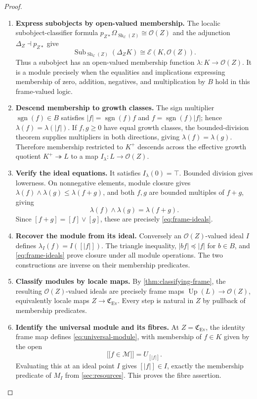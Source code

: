 \documentclass[11pt,a4paper]{article}
\numberwithin{algorithm}{section}
\numberwithin{equation}{section}
\theoremstyle{definition}
\theoremstyle{remark}
\theoremstyle{plain}
\newcommand{\E}{\mathcal E}
\newcommand{\onto}{\twoheadrightarrow}
\newcommand{\llbracket}{\mathopen{[\![}}
\newcommand{\rrbracket}{\mathclose{]\!]}}
\newcommand{\Sub}{\operatorname{Sub}}
\newcommand{\Ev}{{\operatorname{Ev}}}
\newcommand{\abs}[1]{\lvert #1\rvert}
\newcommand{\Cplx}{\mathfrak C_{\Ev}}
\newcommand{\Up}{\operatorname{Up}}
\newcommand{\Sh}{\operatorname{Sh}}
\theoremstyle{definition}
\theoremstyle{plain}
\begin{document}
\begin{proof}\leavevmode
\begin{enumerate}[leftmargin=*,align=left]
\item \textbf{Express subobjects by open-valued membership.}
The localic subobject-classifier formula
$p_{Z*}\Omega_{\Sh_{\E}(Z)}\cong\mathcal O(Z)$ and the
adjunction $\Delta_Z\dashv p_{Z*}$ give
\[
 \Sub_{\Sh_{\E}(Z)}(\Delta_ZK)
 \cong\E(K,\mathcal O(Z)).
\]
Thus a subobject has an open-valued membership function
$\lambda:K\to\mathcal O(Z)$. It is a module precisely when
the equalities and implications expressing membership of zero,
addition, negatives, and multiplication by $B$ hold in this
frame-valued logic.

\item \textbf{Descend membership to growth classes.}
The sign multiplier $\operatorname{sgn}(f)\in B$ satisfies
$\abs f=\operatorname{sgn}(f)f$ and
$f=\operatorname{sgn}(f)\abs f$; hence
$\lambda(f)=\lambda(\abs f)$. If $f,g\ge0$ have equal
growth classes, the bounded-division theorem supplies
multipliers in both directions, giving $\lambda(f)=\lambda(g)$.
Therefore membership restricted to $K^+$ descends across the effective
growth quotient $K^+\onto L$ to a map
$I_\lambda:L\to\mathcal O(Z)$.

\item \textbf{Verify the ideal equations.}
It satisfies $I_\lambda(0)=\top$. Bounded division gives
lowerness. On nonnegative elements, module closure gives
$\lambda(f)\wedge\lambda(g)\le\lambda(f+g)$,
and both $f,g$ are bounded multiples of $f+g$, giving
\[
 \lambda(f)\wedge\lambda(g)=\lambda(f+g).
\]
Since $[f+g]=[f]\vee[g]$, these are precisely
\eqref{eq:frame-ideals}.

\item \textbf{Recover the module from its ideal.}
Conversely an
$\mathcal O(Z)$-valued ideal $I$ defines
$\lambda_I(f)=I([\abs f])$. The triangle inequality,
$\abs{bf}\preceq\abs f$ for $b\in B$, and
\eqref{eq:frame-ideals} prove closure under all module
operations. The two constructions are inverse on their
membership predicates.

\item \textbf{Classify modules by locale maps.}
By \cref{thm:classifying-frame}, the resulting
$\mathcal O(Z)$-valued ideals are precisely frame maps
$\Up(L)\to\mathcal O(Z)$, equivalently locale maps
$Z\to\Cplx$. Every step is natural in $Z$ by pullback of
membership predicates.

\item \textbf{Identify the universal module and its fibres.}
At $Z=\Cplx$, the identity frame
map defines \eqref{eq:universal-module}, with membership
of $f\in K$ given by the open
\begin{equation}\label{eq:universal-membership}
  \llbracket f\in\mathscr M\rrbracket=U_{[\abs f]}.
\end{equation}
Evaluating this at an ideal point $I$ gives
$[\abs f]\in I$, exactly the membership predicate of
$M_I$ from \cref{sec:resources}. This proves the fibre assertion.
\end{enumerate}
\end{proof}
\end{document}
